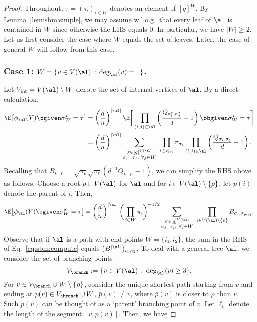 \documentclass[11pt]{article}
\begin{document}
\begin{proof}
Throughout, $\tau=(\tau_i)_{i\in W}$ denotes an element of $[q]^W$.  By Lemma~\ref{lem:sbm:simple}, we may assume w.l.o.g.\ that every leaf of $\al$ is contained in $W$ since otherwise the LHS equals $0$. In particular, we have $|W|\geq 2$. Let us first consider the case where $W$ equals the set of leaves. Later, the case of general $W$ will follow from this case. 

\subsubsection*{Case 1: $W=\{v\in V(\al) \,:\, \deg_{\al}(v)=1\}$.}
Let $V_{\text{int}}= V(\al)\setminus W$ denote the set of internal vertices of $\al$. By a direct calculation, 
\[
\begin{split}
\E\big[\phi_{\al}(Y)\bgiven \sigma^\star_W=\tau\big]
&=\left(\frac{d}{n}\right)^{|\al|}\E\bigg[\prod_{(i,j)\in \al}\left(\frac{Q_{\sigma^\star_i,\sigma^\star_j}}{d}-1\right)\bbgiven \sigma^\star_W=\tau \bigg]\\
&=\left(\frac{d}{n}\right)^{|\al|}\sum_{\substack{\sigma\in [q]^{V(\al)}\\\sigma_j=\tau_j,~\forall j\in W}}~\prod_{i \in V_{\text{int}}}\pi_{\sigma_i}\prod_{(i,j)\in \al}\left(\frac{Q_{\sigma_i,\sigma_j}}{d}-1\right).
\end{split}
\]
Recalling that $B_{k,\ell}=\sqrt{\pi_k}\sqrt{\pi_{\ell}}(d^{-1}Q_{k,\ell}-1)$, we can simplify the RHS above as follows. Choose a root $\rho\in V(\al)$ for $\al$ and for $i\in V(\al)\setminus \{\rho\}$, let $p(i)$ denote the parent of $i$. Then,
\begin{equation}\label{eq:sbm:compute}
\E\big[\phi_{\al}(Y)\bgiven \sigma^\star_W=\tau\big]=\left(\frac{d}{n}\right)^{|\al|}\bigg(\prod_{i\in W}\pi_i\bigg)^{-1/2}\sum_{\substack{\sigma\in [q]^{V(\al)}\\\sigma_j=\tau_j,~\forall j\in W}}~\prod_{i\in V(\al)\setminus\{\rho\}}B_{\sigma_i,\sigma_{p(i)}}.
\end{equation}
Observe that if $\al$ is a path with end points $W=\{i_1,i_2\}$, the sum in the RHS of Eq.~\eqref{eq:sbm:compute} equals $(B^{|\al|})_{i_1,i_2}$. To deal with a general tree $\al$, we consider the set of branching points 
\[
V_{\branch}:=\{v\in V(\al) \,:\, \deg_{\al}(v)\geq 3\}.
\]
For $v\in V_{\branch}\cup W\setminus \{\rho\}$, consider the unique shortest path starting from $v$ and ending at $\bar{p}(v)\in V_{\branch}\cup W$, $\bar{p}(v)\neq v$, where $\bar{p}(v)$ is closer to $\rho$ than $v$. Such $\bar{p}(v)$ can be thought of as a `parent' branching point of $v$. Let $\ell_v$ denote the length of the segment $[v,\bar{p}(v)]$. Then, we have

\end{proof}
\end{document}
